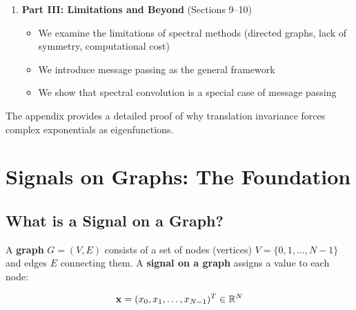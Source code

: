 \begin{notechapter}
\begin{enumerate}
\item \textbf{Part III: Limitations and Beyond} (Sections 9--10)
\begin{itemize}
    \item We examine the limitations of spectral methods (directed graphs, 
          lack of symmetry, computational cost)
    \item We introduce message passing as the general framework
    \item We show that spectral convolution is a special case of message 
          passing
\end{itemize}
\end{enumerate}

The appendix provides a detailed proof of why translation invariance 
forces complex exponentials as eigenfunctions.

\section{Signals on Graphs: The Foundation}

\subsection{What is a Signal on a Graph?}

A \textbf{graph} $G = (V, E)$ consists of a set of nodes (vertices) 
$V = \{0, 1, \ldots, N-1\}$ and edges $E$ connecting them. A 
\textbf{signal on a graph} assigns a value to each node:

\begin{equation}
\mathbf{x} = (x_0, x_1, \ldots, x_{N-1})^T \in \mathbb{R}^N
\end{equation}

\begin{figure}[H]
\centering
{}
\end{figure}
\end{notechapter}
